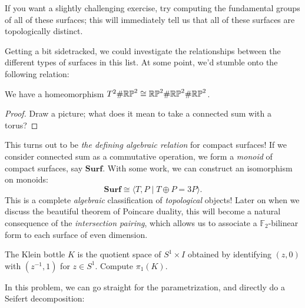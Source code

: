 If you want a slightly challenging exercise, try computing the fundamental groups of all of these surfaces; this will immediately tell us that all of these surfaces are topologically distinct.

\medskip
Getting a bit sidetracked, we could investigate the relationships between the different types of surfaces in this list. At some point, we'd stumble onto the following relation:

\begin{claim}
    We have a homeomorphism $T^2\# \mathbb{RP}^2 \cong \mathbb{RP}^2\# \mathbb{RP}^2 \# \mathbb{RP}^2$.
\end{claim}
\begin{proof}
    Draw a picture; what does it mean to take a connected sum with a torus?
\end{proof}

This turns out to be \emph{the defining algebraic relation} for compact surfaces! If we consider connected sum as a commutative operation, we form a \emph{monoid} of compact surfaces, say $\mathbf{Surf}$. With some work, we can construct an isomorphism on monoids:
\[\textbf{Surf} \cong \langle T, P \mid T\oplus P = 3P\rangle.\]
This is a complete \emph{algebraic} classification of \emph{topological} objects! Later on when we discuss the beautiful theorem of Poincare duality, this will become a natural consequence of the \emph{intersection pairing}, which allows us to associate a $\mathbb{F}_2$-bilinear form to each surface of even dimension.

\begin{problem}{2.2}
    The Klein bottle $K$ is the quotient space of $S^1\times I$ obtained by identifying $(z,0)$ with $(z^{-1},1)$ for $z\in S^1$. Compute $\pi_1(K)$.
\end{problem}

In this problem, we can go straight for the parametrization, and directly do a Seifert decomposition:

